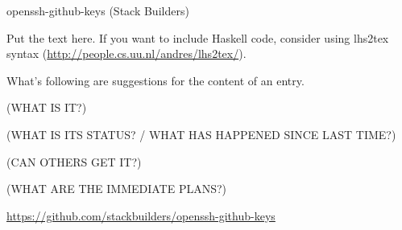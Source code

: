 \documentclass[DIV16,twocolumn,10pt]{scrreprt}
\begin{document}
\begin{hcarentry}{openssh-github-keys (Stack Builders)}
\makeheader

Put the text here. 
If you want to include Haskell code, consider using lhs2tex syntax (\url{http://people.cs.uu.nl/andres/lhs2tex/}).

What's following are suggestions for the content of an entry.

(WHAT IS IT?)

(WHAT IS ITS STATUS? / WHAT HAS HAPPENED SINCE LAST TIME?)

(CAN OTHERS GET IT?)

(WHAT ARE THE IMMEDIATE PLANS?)

\FurtherReading
  \url{https://github.com/stackbuilders/openssh-github-keys}
\end{hcarentry}
\end{document}
